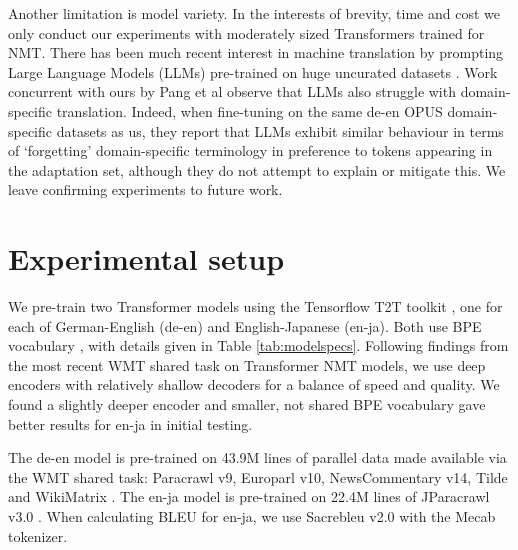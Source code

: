 \documentclass[11pt]{article}
\begin{document}
Another limitation is model variety. In the interests of brevity, time and cost we only conduct our experiments with moderately sized Transformers trained for NMT. There has been much recent interest in machine translation by prompting Large Language Models (LLMs) pre-trained on huge uncurated datasets \cite{zhang-etal-2023-machine}. Work concurrent with ours by Pang et al  observe that LLMs also struggle with domain-specific translation. Indeed, when fine-tuning on the same de-en OPUS domain-specific datasets as us, they report that LLMs exhibit similar behaviour in terms of `forgetting' domain-specific terminology in preference to tokens appearing in the adaptation set, although they do not attempt to explain or mitigate this. We leave confirming experiments to future work.







\appendix
\section{Experimental setup}
\label{appendix-setup}


We pre-train two Transformer models using the Tensorflow T2T toolkit \cite{vaswani-etal-2018-tensor2tensor}, one for each of German-English (de-en) and English-Japanese (en-ja). Both use BPE vocabulary  \cite{sennrich-etal-2016-neural}, with details given in Table \ref{tab:modelspecs}. Following findings from the most recent WMT shared task \cite{kocmi-etal-2023-findings} on Transformer NMT models, we use deep encoders with relatively shallow decoders for a balance of speed and quality. We found a slightly deeper encoder and smaller, not shared BPE vocabulary gave better results for en-ja in initial testing.

The de-en model is pre-trained on 43.9M lines of parallel data made available via the WMT shared task: Paracrawl v9, Europarl v10, NewsCommentary v14, Tilde and WikiMatrix \cite{kocmi-etal-2022-findings}. The en-ja model is pre-trained on 22.4M lines of JParacrawl v3.0 \cite{morishita-etal-2022-jparacrawl}.  When calculating BLEU for en-ja, we use Sacrebleu v2.0 \cite{post-2018-call} with the Mecab tokenizer. 
\end{document}
